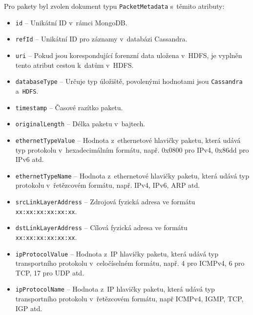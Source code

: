 \vspace{0.5cm}
\noindent Pro pakety byl zvolen dokument typu \texttt{PacketMetadata} s~těmito atributy:

\begin{itemize}
    \item \texttt{id} -- Unikátní ID v~rámci MongoDB.
    
    \item \texttt{refId} -- Unikátní ID pro záznamy v~databázi Cassandra.
    
    \item \texttt{uri} -- Pokud jsou korespondující forenzní data uložena v~HDFS, je vyplněn tento atribut cestou k~datům v~HDFS.
    
    \item \texttt{databaseType} -- Určuje typ úložiště, povolenými hodnotami jsou \texttt{Cassandra} a~\texttt{HDFS}.
    
    \item \texttt{timestamp} -- Časové razítko paketu.
    
    \item \texttt{originalLength} -- Délka paketu v~bajtech.
    
    \item \texttt{ethernetTypeValue} -- Hodnota z~ethernetové hlavičky paketu, která udává typ protokolu v~hexadecimálním formátu, např. 0x0800 pro IPv4, 0x86dd pro IPv6 atd.
    
    \item \texttt{ethernetTypeName} -- Hodnota z~ethernetové hlavičky paketu, která udává typ protokolu v~řetězcovém formátu, např. IPv4, IPv6, ARP atd.
    
    \item \texttt{srcLinkLayerAddress} -- Zdrojová fyzická adresa ve formátu \texttt{xx:xx:xx:xx:xx:xx}.
    
    \item \texttt{dstLinkLayerAddress} -- Cílová fyzická adresa ve formátu \texttt{xx:xx:xx:xx:xx:xx}.
    
    \item \texttt{ipProtocolValue} -- Hodnota z~IP hlavičky paketu, která udává typ transportního protokolu v~celočíselném formátu, např. 4 pro ICMPv4, 6 pro TCP, 17 pro UDP atd.
    
    \item \texttt{ipProtocolName} -- Hodnota z~IP hlavičky paketu, která udává typ transportního protokolu v~řetězcovém formátu, např ICMPv4, IGMP, TCP, IGP atd.
    

\end{itemize}
